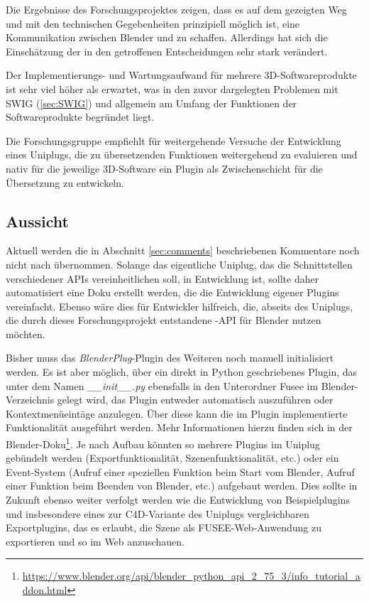 
Die Ergebnisse des Forschungsprojektes zeigen, dass es auf dem gezeigten Weg und mit den technischen Gegebenheiten prinzipiell möglich ist, eine Kommunikation zwischen Blender und \CS zu schaffen. Allerdings hat sich die Einschätzung der in den  getroffenen Entscheidungen sehr stark verändert.

Der Implementierungs- und Wartungsaufwand für mehrere 3D-Software\-produkte ist sehr viel höher als erwartet, was in den zuvor dargelegten Problemen mit SWIG (\ref{sec:SWIG}) und allgemein am Umfang der Funktionen der Softwareprodukte begründet liegt.

Die Forschungsgruppe empfiehlt für weitergehende Versuche der Entwicklung eines Uniplugs, die zu übersetzenden Funktionen weitergehend zu evaluieren und nativ für die jeweilige 3D-Software ein Plugin als Zwischenschicht für die Übersetzung zu entwickeln.



\subsection{Aussicht}

Aktuell werden die in Abschnitt \ref{sec:comments} beschriebenen Kommentare noch nicht nach \CS übernommen. Solange das eigentliche Uniplug, das die Schnittstellen verschiedener APIs vereinheitlichen soll, in Entwicklung ist, sollte daher automatisiert eine Doku erstellt werden, die die Entwicklung eigener Plugins vereinfacht. Ebenso wäre dies für Entwickler hilfreich, die, abseits des Uniplugs, die durch dieses Forschungsprojekt entstandene \CC-API für Blender nutzen möchten.

Bisher muss das \emph{BlenderPlug}-Plugin des Weiteren noch manuell initialisiert werden. Es ist aber möglich, über ein direkt in Python geschriebenes Plugin, das unter dem Namen \emph{\_\_init\_\_.py} ebensfalls in den Unterordner Fusee im Blender-Verzeichnis gelegt wird, das Plugin entweder automatisch auszuführen oder Kontextmenüeintäge anzulegen. Über diese kann die im Plugin implementierte Funktionalität ausgeführt werden. Mehr Informationen hierzu finden sich in der Blender-Doku\footnote{\url{https://www.blender.org/api/blender_python_api_2_75_3/info_tutorial_addon.html}}. Je nach Aufbau könnten so mehrere Plugins im Uniplug gebündelt werden (Exportfunktionalität, Szenenfunktionalität, etc.) oder ein Event-System (Aufruf einer speziellen Funktion beim Start vom Blender, Aufruf einer Funktion beim Beenden von Blender, etc.) aufgebaut werden. Dies sollte in Zukunft ebenso weiter verfolgt werden wie die Entwicklung von Beispielplugins und insbesondere eines zur C4D-Variante des Uniplugs vergleichbaren Exportplugins, das es erlaubt, die Szene als FUSEE-Web-Anwendung zu exportieren und so im Web anzuschauen.

